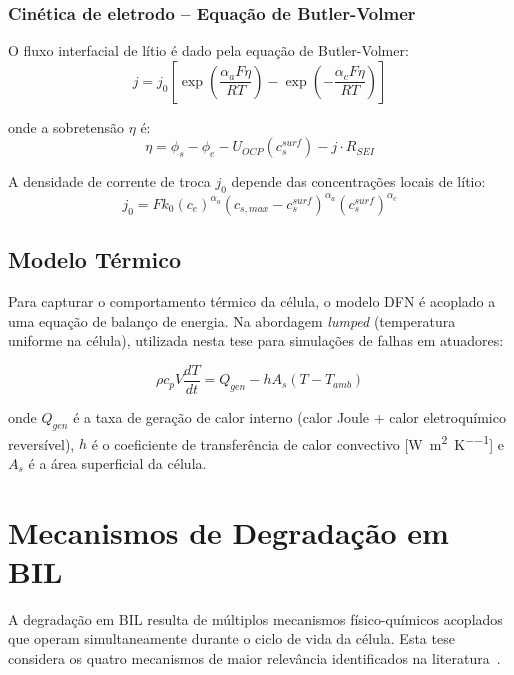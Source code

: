 \documentclass[
    12pt,
    openright,
    twoside,
    a4paper,
    brazil,
    english
]{abntex2}
\begin{document}
\subsubsection{Cinética de eletrodo -- Equação de Butler-Volmer}

O fluxo interfacial de lítio é dado pela equação de Butler-Volmer:
\begin{equation}
  j = j_0 \left[\exp\left(\frac{\alpha_a F \eta}{RT}\right) -
  \exp\left(-\frac{\alpha_c F \eta}{RT}\right)\right]
  \label{eq:butler_volmer}
\end{equation}

onde a sobretensão $\eta$ é:
\begin{equation}
  \eta = \phi_s - \phi_e - U_{OCP}(c_s^{surf}) - j \cdot R_{SEI}
\end{equation}

A densidade de corrente de troca $j_0$ depende das concentrações locais de
lítio:
\begin{equation}
  j_0 = F k_0 (c_e)^{\alpha_a} (c_{s,max} - c_s^{surf})^{\alpha_a}
  (c_s^{surf})^{\alpha_c}
\end{equation}

\subsection{Modelo Térmico}

Para capturar o comportamento térmico da célula, o modelo DFN é acoplado a
uma equação de balanço de energia. Na abordagem \textit{lumped} (temperatura
uniforme na célula), utilizada nesta tese para simulações de falhas em
atuadores:

\begin{equation}
  \rho c_p V \frac{dT}{dt} = Q_{gen} - h A_s (T - T_{amb})
  \label{eq:balanco_energia}
\end{equation}

onde $Q_{gen}$ é a taxa de geração de calor interno (calor Joule + calor
eletroquímico reversível), $h$ é o coeficiente de transferência de calor
convectivo [\si{\watt\per\meter\squared\per\kelvin}] e $A_s$ é a área
superficial da célula.

\section{Mecanismos de Degradação em BIL}

A degradação em BIL resulta de múltiplos mecanismos físico-químicos acoplados
que operam simultaneamente durante o ciclo de vida da célula. Esta tese considera
os quatro mecanismos de maior relevância identificados na literatura~\cite{okane2022lithium}.
\end{document}
